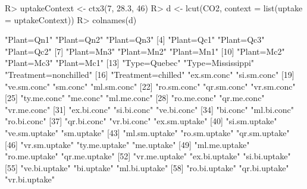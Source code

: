 \begin{Schunk}
% --begin: "pbld2"
\begin{Sinput}
R> uptakeContext <- ctx3(7, 28.3, 46)
R> d <- lcut(CO2, context = list(uptake = uptakeContext))
R> colnames(d)
\end{Sinput}
\begin{Soutput}
 [1] "Plant=Qn1"            "Plant=Qn2"            "Plant=Qn3"           
 [4] "Plant=Qc1"            "Plant=Qc3"            "Plant=Qc2"           
 [7] "Plant=Mn3"            "Plant=Mn2"            "Plant=Mn1"           
[10] "Plant=Mc2"            "Plant=Mc3"            "Plant=Mc1"           
[13] "Type=Quebec"          "Type=Mississippi"     "Treatment=nonchilled"
[16] "Treatment=chilled"    "ex.sm.conc"           "si.sm.conc"          
[19] "ve.sm.conc"           "sm.conc"              "ml.sm.conc"          
[22] "ro.sm.conc"           "qr.sm.conc"           "vr.sm.conc"          
[25] "ty.me.conc"           "me.conc"              "ml.me.conc"          
[28] "ro.me.conc"           "qr.me.conc"           "vr.me.conc"          
[31] "ex.bi.conc"           "si.bi.conc"           "ve.bi.conc"          
[34] "bi.conc"              "ml.bi.conc"           "ro.bi.conc"          
[37] "qr.bi.conc"           "vr.bi.conc"           "ex.sm.uptake"        
[40] "si.sm.uptake"         "ve.sm.uptake"         "sm.uptake"           
[43] "ml.sm.uptake"         "ro.sm.uptake"         "qr.sm.uptake"        
[46] "vr.sm.uptake"         "ty.me.uptake"         "me.uptake"           
[49] "ml.me.uptake"         "ro.me.uptake"         "qr.me.uptake"        
[52] "vr.me.uptake"         "ex.bi.uptake"         "si.bi.uptake"        
[55] "ve.bi.uptake"         "bi.uptake"            "ml.bi.uptake"        
[58] "ro.bi.uptake"         "qr.bi.uptake"         "vr.bi.uptake"        
\end{Soutput}
%
% --end: "pbld2"
\end{Schunk}
